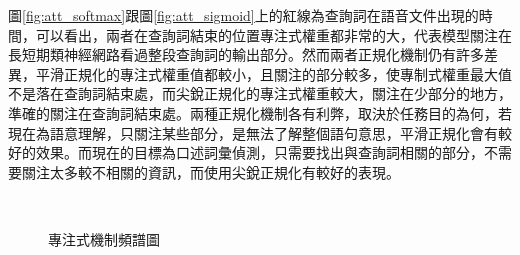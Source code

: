 圖\ref{fig:att_softmax}跟圖\ref{fig:att_sigmoid}上的紅線為查詢詞在語音文件出現的時間，可以看出，兩者在查詢詞結束的位置專注式權重都非常的大，代表模型關注在長短期類神經網路看過整段查詢詞的輸出部分。然而兩者正規化機制仍有許多差異，平滑正規化的專注式權重值都較小，且關注的部分較多，使專制式權重最大值不是落在查詢詞結束處，而尖銳正規化的專注式權重較大，關注在少部分的地方，準確的關注在查詢詞結束處。兩種正規化機制各有利弊，取決於任務目的為何，若現在為語意理解，只關注某些部分，是無法了解整個語句意思，平滑正規化會有較好的效果。而現在的目標為口述詞彙偵測，只需要找出與查詢詞相關的部分，不需要關注太多較不相關的資訊，而使用尖銳正規化有較好的表現。
\begin{figure}[hb]
\centering
{}
\\
\caption{專注式機制頻譜圖}
\end{figure}

